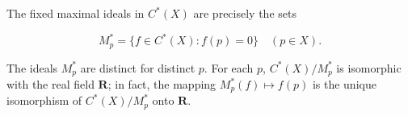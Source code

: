The fixed maximal ideals in \(C^*(X)\) are precisely the sets

\[
M^*_p = \{ f \in C^*(X) : f(p) = 0 \} \quad (p \in X).
\]

The ideals \(M^*_p\) are distinct for distinct \(p\). For each \(p\), \(C^*(X)/M^*_p\) is isomorphic with the real field \(\mathbf{R}\); in fact, the mapping \(M^*_p(f) \mapsto f(p)\) is the unique isomorphism of \(C^*(X)/M^*_p\) onto \(\mathbf{R}\).
